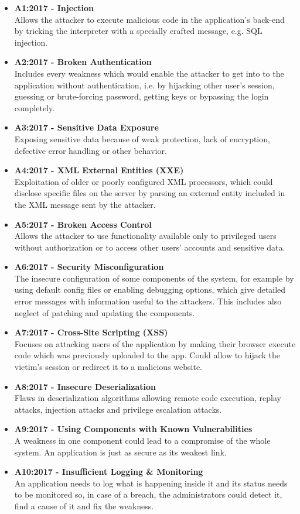 \documentclass[a4paper]{article}
\begin{document}
\begin{itemize}
	\item \textbf{A1:2017 - Injection} \\
		Allows the attacker to execute malicious code in the
		application's back-end by tricking the interpreter with a
		specially crafted message, e.g. SQL injection.
	\item \textbf{A2:2017 - Broken Authentication} \\
		Includes every weakness which would enable the attacker to get
		into to the application without authentication, i.e. by 
		hijacking other user's session, guessing or brute-forcing
		password, getting keys or bypassing the login completely.
	\item \textbf{A3:2017 - Sensitive Data Exposure} \\
		Exposing sensitive data because of weak protection, lack of
		encryption, defective error handling or other behavior.
	\item \textbf{A4:2017 - XML External Entities (XXE)} \\
		Exploitation of older or poorly configured XML processors, which
		could disclose specific files on the server by parsing an
		external entity included in the XML message sent by the
		attacker.
	\item \textbf{A5:2017 - Broken Access Control} \\
		Allows the attacker to use functionality available only to
		privileged users without authorization or to access other users'
		accounts and sensitive data.
	\item \textbf{A6:2017 - Security Misconfiguration} \\
		The insecure configuration of some components of the system, for
		example by using default config files or enabling debugging
		options, which give detailed error messages with information
		useful to the attackers. This includes also neglect of patching
		and updating the components.
	\item \textbf{A7:2017 - Cross-Site Scripting (XSS)} \\
		Focuses on attacking users of the application by making their
		browser execute code which was previously uploaded to the
		app. Could allow to hijack the victim's session or redirect it
		to a malicious website. 
	\item \textbf{A8:2017 - Insecure Deserialization} \\
		Flaws in deserialization algorithms allowing remote code
		execution, replay attacks, injection attacks and privilege
		escalation attacks.
	\item \textbf{A9:2017 - Using Components with Known Vulnerabilities} \\
		A weakness in one component could lead to a compromise of the
		whole system. An application is just as secure as its weakest
		link.
	\item \textbf{A10:2017 - Insufficient Logging \& Monitoring} \\
		An application needs to log what is happening inside it and its
		status needs to be monitored so, in case of a breach,
		the administrators could detect it, find a cause of it and fix
		the weakness.
\end{itemize}
\end{document}
